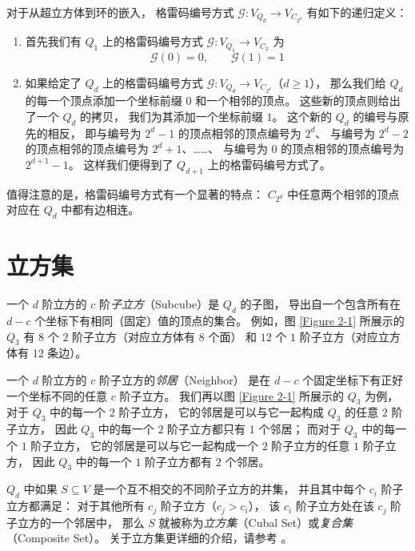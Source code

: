 对于从超立方体到环的嵌入，
格雷码编号方式 $\mathcal{G} \colon V_{Q_d} \rightarrow V_{C_{2^d}}$ 有如下的递归定义：
\begin{enumerate}[(1)]
	\item 首先我们有 $Q_1$ 上的格雷码编号方式
		$\mathcal{G} \colon V_{Q_1} \rightarrow V_{C_2}$ 为
		\begin{equation}
		\mathcal{G}(0) = 0, \qquad \mathcal{G}(1) = 1
		\end{equation}
	\item 如果给定了 $Q_d$ 上的格雷码编号方式
		$\mathcal{G} \colon V_{Q_d} \rightarrow V_{C_{2^d}}$（$d \ge 1$），
		那么我们给 $Q_d$ 的每一个顶点添加一个坐标前缀 $0$ 和一个相邻的顶点。
		这些新的顶点则给出了一个 $Q_d$ 的拷贝，
		我们为其添加一个坐标前缀 $1$。
		这个新的 $Q_d$ 的编号与原先的相反，
		即与编号为 $2^d - 1$ 的顶点相邻的顶点编号为 $2^d$、
		与编号为 $2^d - 2$ 的顶点相邻的顶点编号为 $2^d + 1$、……、
		与编号为 $0$ 的顶点相邻的顶点编号为 $2^{d + 1} - 1$。
		这样我们便得到了 $Q_{d + 1}$ 上的格雷码编号方式了。
\end{enumerate}
值得注意的是，格雷码编号方式有一个显著的特点：
$C_{2^d}$ 中任意两个相邻的顶点对应在 $Q_d$ 中都有边相连。

\section{立方集}
\label{Section 2.4}

一个 $d$ 阶立方的 $c$ 阶\emph{子立方}（Subcube）是 $Q_d$ 的子图，
导出自一个包含所有在 $d − c$ 个坐标下有相同（固定）值的顶点的集合。
例如，图 \ref{Figure 2-1} 所展示的 $Q_3$ 有 $8$ 个 $2$ 阶子立方（对应立方体有 $8$ 个面）
和 $12$ 个 $1$ 阶子立方（对应立方体有 $12$ 条边）。

一个 $d$ 阶立方的 $c$ 阶子立方的\emph{邻居}（Neighbor）
是在 $d − c$ 个固定坐标下有正好一个坐标不同的任意 $c$ 阶子立方。
我们再以图 \ref{Figure 2-1} 所展示的 $Q_3$ 为例，
对于 $Q_3$ 中的每一个 $2$ 阶子立方，
它的邻居是可以与它一起构成 $Q_3$ 的任意 $2$ 阶子立方，
因此 $Q_3$ 中的每一个 $2$ 阶子立方都只有 $1$ 个邻居；
而对于 $Q_3$ 中的每一个 $1$ 阶子立方，
它的邻居是可以与它一起构成一个 $2$ 阶子立方的任意 $1$ 阶子立方，
因此 $Q_3$ 中的每一个 $1$ 阶子立方都有 $2$ 个邻居。

$Q_d$ 中如果 $S \subseteq V$ 是一个互不相交的不同阶子立方的并集，
并且其中每个 $c_i$ 阶子立方都满足：
对于其他所有 $c_j$ 阶子立方（$c_j > c_i$），
该 $c_i$ 阶子立方处在该 $c_j$ 阶子立方的一个邻居中，
那么 $S$ 就被称为\emph{立方集}（Cubal Set）或\emph{复合集}（Composite Set）。
关于立方集更详细的介绍，请参考 \cite{Harper.2004}。
